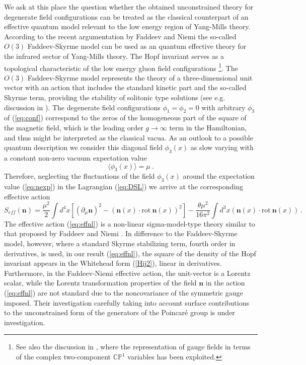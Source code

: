 \documentclass[a4paper,12pt]{article}
\begin{document}
We ask at this place the question whether the obtained unconstrained theory for
degenerate field configurations can be treated as the classical counterpart of
an effective quantum model relevant to the low energy region of Yang-Mills theory.
According to the recent argumentation by
Faddeev and Niemi \cite{FaddeevNiemi} the so-called
$O(3)$ Faddeev-Skyrme model can be used as an quantum effective
theory for the infrared sector of Yang-Mills theory. The Hopf invariant
serves as a topological characteristic of the low energy gluon
field configurations \cite{Langmann}
\footnote{See also the discussion in
\cite{BaalWipf},  where the representation of gauge fields in terms of the
complex two-component $\mathbb{C}\mathbb{P}^1$ variables has been exploited.}.
The $O(3)$ Faddeev-Skyrme model represents the
theory of a three-dimensional unit vector with an action
that includes the standard kinetic part and the so-called
Skyrme term, providing the stability of solitonic type solutions
(see e.g. discussion in \cite{Battye:1998}).
The degenerate field configurations $\phi_1=\phi_2=0$
with arbitrary $\phi_3$ of (\ref{eq:conf}) correspond to the zeros of the
homogeneous part of the square of the magnetic field, which is the leading
order $g \rightarrow \infty $ term in the Hamiltonian, and thus might
be interpreted as the classical vacua.
As an outlook to a possible quantum description we consider this diagonal field
$\phi_3(x)$ as slow varying with a constant non-zero vacuum expectation value
\begin{equation}\label{eq:nexp}
\langle \phi_3(x)\rangle = \mu~.
\end{equation}
Therefore, neglecting the fluctuations of the
field $\phi_3(x)$ around the expectation value (\ref{eq:nexp})
in the Lagrangian (\ref{eq:DSL}) we arrive at the corresponding effective action
\begin{equation}
\label{eq:effnl}
  S_{eff}({\mathbf n}) = \frac{\mu^2}{2}\int d^4 x
  \left[ (\partial_\mu {\mathbf n})^2 -
  \left({\mathbf n}(x)\cdot \mbox{rot}\ {\mathbf n}(x) \right)^2\right] -
\frac{\theta \mu^2}{16\pi^2}\int d^3 x
\left({\mathbf n}(x)\cdot \mbox{rot}\ {\mathbf n}(x) \right) \,.
\end{equation}
The effective action (\ref{eq:effnl}) is a non-linear sigma-model-type
theory similar to that proposed by Faddeev and Niemi \cite{FaddeevNiemi}.
In difference to the Faddeev-Skyrme model, however,
where a standard Skyrme stabilizing term, fourth order in derivatives,
is used, in our result (\ref{eq:effnl}),
the square of the density of the Hopf invariant appears in the Whitehead
form (\ref{Hij2}), linear in derivatives.
Furthermore, in the Faddeev-Niemi effective action, the unit-vector
is a Lorentz scalar, while the Lorentz transformation
properties of the field ${\mathbf n}$ in the action (\ref{eq:effnl})
are not standard due to the noncovariance of the symmetric gauge imposed.
Their investigation carefully taking into account surface contributions
to the unconstrained form of the generators of the Poincar\'{e} group is
under investigation.
\end{document}
